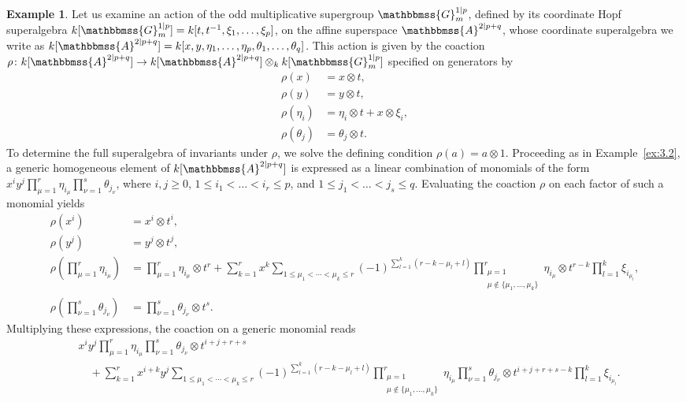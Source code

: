 \documentclass[11pt,a4paper,reqno,noamsfonts]{amsart}
\numberwithin{equation}{section}
\theoremstyle{definition}
\newtheorem{example}[theorem]{Example}
\theoremstyle{remark}
\renewcommand{\AA}{\ensuremath{\mathbbmss{A}}}
\newcommand{\GG}{\ensuremath{\mathbbmss{G}}}
\begin{document}
\begin{example}\label{ex:3.10}
Let us examine an action of the odd multiplicative supergroup $\GG_m^{1 \vert p}$, defined by its coordinate Hopf superalgebra $k[\GG_m^{1 \vert p}] = k[t,t^{-1},\xi_1,\dots,\xi_p]$, on the affine superspace $\AA^{2 \vert p+q}$, whose coordinate superalgebra we write as $k[\AA^{2 \vert p+q}] = k[x,y,\eta_1,\dots,\eta_p,\theta_1,\dots,\theta_q]$.  This action is given by the coaction $\rho \colon k[\AA^{2 \vert p+q}] \to k[\AA^{2 \vert p+q}] \otimes_k k[\GG_{m}^{1 \vert p}]$ specified on generators by
$$
\begin{aligned}
\rho(x) &= x \otimes t, \\
\rho(y) &= y \otimes t, \\
\rho(\eta_i) & = \eta_i \otimes t + x \otimes \xi_i, \\
\rho(\theta_j) &= \theta_j \otimes t.
\end{aligned}
$$
To determine the full superalgebra of invariants under $\rho$, we solve the defining condition $\rho(a) = a \otimes 1$. Proceeding as in Example~\ref{ex:3.2}, a generic homogeneous element of $k[\AA^{2 \vert p+q}]$ is expressed as a linear combination of monomials of the form $x^{i} y^{j} \prod_{\mu=1}^{r}\eta_{i_{\mu}} \prod_{\nu=1}^{s} \theta_{j_{\nu}}$, where $i, j \ge 0$, $1 \le i_1 < \dots < i_r \le p$, and $1 \le j_1 < \dots < j_s \le q$. Evaluating the coaction $\rho$ on each factor of such a monomial yields
$$
\begin{aligned}
\rho(x^{i}) &= x^{i} \otimes t^{i}, \\
\rho(y^{j}) &= y^{j} \otimes t^{j},  \\
 \rho \left( \prod_{\mu=1}^{r} \eta_{i_{\mu}} \right) &=  \prod_{\mu=1}^{r} \eta_{i_{\mu}}  \otimes t^{r}  + \sum_{k=1}^{r} x^{k} \sum_{1 \leq \mu_1 < \cdots < \mu_k \leq r}(-1)^{\sum_{l=1}^{k} (r - k - \mu_l  +l)} \prod_{\substack{\mu=1 \\ \mu \not\in \{ \mu_1,\dots,\mu_k \}}}^{r} \eta_{i_{\mu}}   \otimes t^{r-k}\prod_{l=1}^{k}  \xi_{i_{\mu_{l}}}, \\
\rho \left( \prod_{\nu=1}^{s}\theta_{j_{\nu}}  \right) &=  \prod_{\nu=1}^{s}\theta_{j_{\nu}}   \otimes t^{s}.
\end{aligned}
$$
Multiplying these expressions, the coaction on a generic monomial reads
$$
\begin{aligned}
&x^{i} y^{j}  \prod_{\mu=1}^{r} \eta_{i_{\mu}} \prod_{\nu=1}^{s}\theta_{j_{\nu}}  \otimes t^{i + j + r + s} \\
 &\quad + \sum_{k = 1}^{r} x^{i + k} y^{j} \sum_{1 \leq \mu_1 < \cdots < \mu_k \leq r}(-1)^{\sum_{l=1}^{k} (r - k - \mu_l  +l)} \prod_{\substack{\mu=1 \\ \mu \not\in \{ \mu_1,\dots,\mu_k \}}}^{r} \eta_{i_{\mu}}   \prod_{\nu=1}^{s}\theta_{j_{\nu}}    \otimes t^{i + j+r+s-k} \prod_{l=1}^{k}  \xi_{i_{\mu_{l}}}.

\end{aligned}$$
\end{example}
\end{document}
